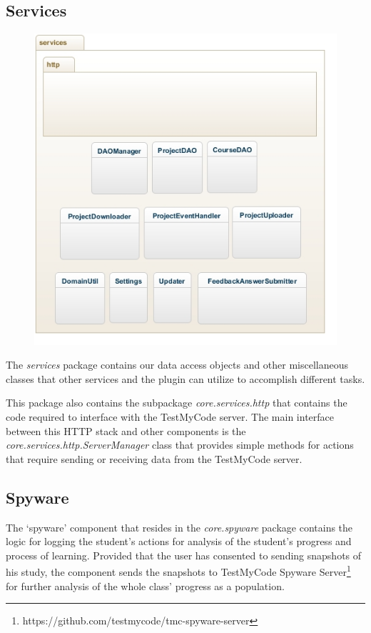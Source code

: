 \documentclass[12pt,a4paper,english,leqno]{article}
\begin{document}
\subsection{Services}

\begin{figure}[H]
\centering
\includegraphics[scale=1]{img/services.jpg}
\end{figure}

The \textit{services} package contains our data access objects and other miscellaneous classes that other services and the plugin can utilize to accomplish different tasks.

This package also contains the subpackage \textit{core.services.http} that contains the code required to interface with the TestMyCode server.
The main interface between this HTTP stack and other components is the \textit{core.services.http.ServerManager} class that provides simple methods for actions that require sending or receiving data from the TestMyCode server.

\subsection{Spyware}

The `spyware' component that resides in the \textit{core.spyware} package contains the logic for logging the student's actions for analysis of the student's progress and process of learning.
Provided that the user has consented to sending snapshots of his study, the component sends the snapshots to TestMyCode Spyware Server\footnote{https://github.com/testmycode/tmc-spyware-server} for further analysis of the whole class' progress as a population.
\end{document}
